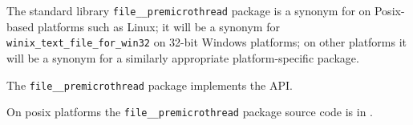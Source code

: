 
The standard library {\tt file\_\_premicrothread} package is a synonym for 
on Posix-based platforms such as Linux; it will be a synonym for 
{\tt winix\_text\_file\_for\_win32} 
on 32-bit Windows platforms; on other platforms it will be a synonym for 
a similarly appropriate platform-specific package. 

The {\tt file\_\_premicrothread} package implements the  API.

On posix platforms the {\tt file\_\_premicrothread} package source code is in .



